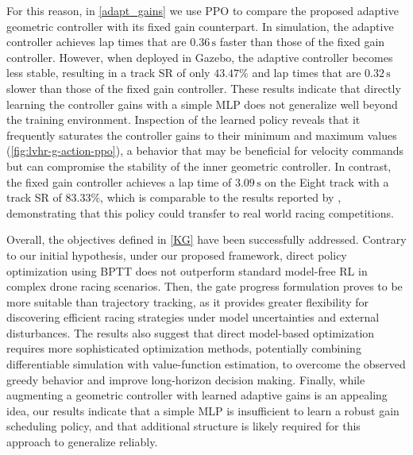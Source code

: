 For this reason, in \autoref{adapt_gains} we use \ac{PPO} to compare the proposed adaptive geometric controller with its fixed gain counterpart.
In simulation, the adaptive controller achieves lap times that are $\mathbf{0.36\, \mathrm{s}}$ faster than those of the fixed gain controller.
However, when deployed in Gazebo, the adaptive controller becomes less stable, resulting in a track \ac{SR} of only $\mathbf{43.47\%}$ and lap times that are $0.32\, \mathrm{s}$ slower than those of the fixed gain controller.
These results indicate that directly learning the controller gains with a simple \ac{MLP} does not generalize well beyond the training environment.
Inspection of the learned policy reveals that it frequently saturates the controller gains to their minimum and maximum values (\autoref{fig:lvhr-g-action-ppo}), a behavior that may be beneficial for velocity commands but can compromise the stability of the inner geometric controller.
In contrast, the fixed gain controller achieves a lap time of $\mathbf{3.09\, \mathrm{s}}$ on the Eight track with a track \ac{SR} of $\mathbf{83.33\%}$, which is comparable to the results reported by \cite{ferede2025, green_bridging_2026,}, demonstrating that this policy could transfer to real world racing competitions.

Overall, the objectives defined in \autoref{KG} have been successfully addressed.
Contrary to our initial hypothesis, under our proposed framework, direct policy optimization using \ac{BPTT} does not outperform standard model-free \ac{RL} in complex drone racing scenarios.
Then, the gate progress formulation proves to be more suitable than trajectory tracking, as it provides greater flexibility for discovering efficient racing strategies under model uncertainties and external disturbances.
The results also suggest that direct model-based optimization requires more sophisticated optimization methods, potentially combining differentiable simulation with value-function estimation, to overcome the observed greedy behavior and improve long-horizon decision making.
Finally, while augmenting a geometric controller with learned adaptive gains is an appealing idea, our results indicate that a simple \ac{MLP} is insufficient to learn a robust gain scheduling policy, and that additional structure is likely required for this approach to generalize reliably.





